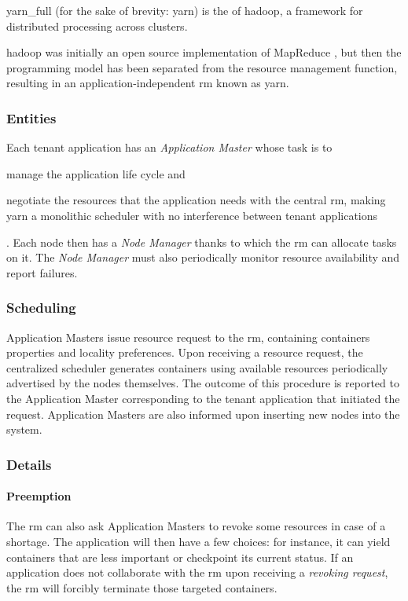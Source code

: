 \glsdesc{yarn_full} (for the sake of brevity: \glsdesc{yarn}) is the  of \glsdesc{hadoop}, a framework for distributed processing across clusters.

\glsdesc{hadoop} was initially an open source implementation of MapReduce \cite{mapreduce}, but then the programming model has been separated from the resource management function, resulting in an application-independent \gls{rm} known as \glsdesc{yarn}.

\subsubsection{Entities}
Each tenant application has an \textit{Application Master} whose task is to
\begin{mylist}
    \item manage the application life cycle and
    \item negotiate the resources that the application needs with the central \gls{rm}, making \glsdesc{yarn} a monolithic scheduler with no interference between tenant applications
\end{mylist}.
Each node then has a \textit{Node Manager} thanks to which the \gls{rm} can allocate tasks on it.
The \textit{Node Manager} must also periodically monitor resource availability and report failures.

\subsubsection{Scheduling}
Application Masters issue resource request to the \gls{rm}, containing containers properties and locality preferences.
Upon receiving a resource request, the centralized scheduler generates containers using available resources periodically advertised by the nodes themselves.
The outcome of this procedure is reported to the Application Master corresponding to the tenant application that initiated the request.
Application Masters are also informed upon inserting new nodes into the system.

\subsubsection{Details}
\paragraph{Preemption}
The \gls{rm} can also ask Application Masters to revoke some resources in case of a shortage.
The application will then have a few choices: for instance, it can yield containers that are less important or checkpoint its current status.
If an application does not collaborate with the \gls{rm} upon receiving a \textit{revoking request}, the \gls{rm} will forcibly terminate those targeted containers.
